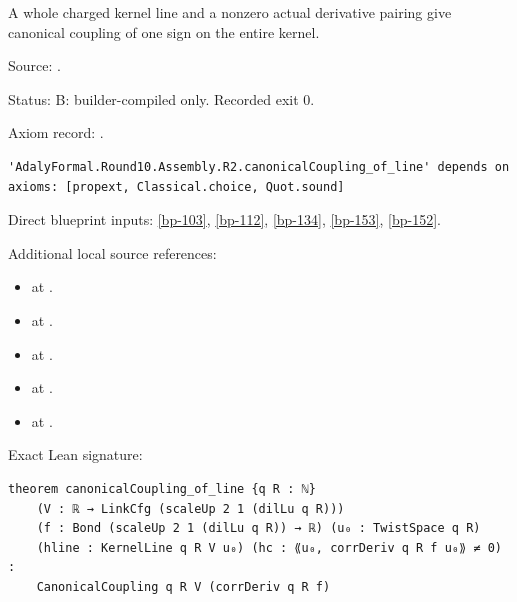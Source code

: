 \begin{theorem}[bp-154]
\label{bp-154}
\leanok
A whole charged kernel line and a nonzero actual derivative pairing give canonical coupling of one sign on the entire kernel.

\par Source: \texttt{}.
\par Status: B: builder-compiled only. Recorded exit 0.
\par Axiom record: \texttt{}.
\begin{verbatim}
'AdalyFormal.Round10.Assembly.R2.canonicalCoupling_of_line' depends on axioms: [propext, Classical.choice, Quot.sound]
\end{verbatim}
\par Direct blueprint inputs: \ref{bp-103}, \ref{bp-112}, \ref{bp-134}, \ref{bp-153}, \ref{bp-152}.
\par Additional local source references:
\begin{itemize}
\item \texttt{} at \texttt{}.
\item \texttt{} at \texttt{}.
\item \texttt{} at \texttt{}.
\item \texttt{} at \texttt{}.
\item \texttt{} at \texttt{}.
\end{itemize}
\par Exact Lean signature:
\begin{verbatim}
theorem canonicalCoupling_of_line {q R : ℕ}
    (V : ℝ → LinkCfg (scaleUp 2 1 (dilLu q R)))
    (f : Bond (scaleUp 2 1 (dilLu q R)) → ℝ) (u₀ : TwistSpace q R)
    (hline : KernelLine q R V u₀) (hc : ⟪u₀, corrDeriv q R f u₀⟫ ≠ 0) :
    CanonicalCoupling q R V (corrDeriv q R f)
\end{verbatim}
\end{theorem}


